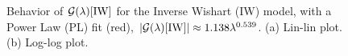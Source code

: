 \begin{figure}[t]
  \centering
    \caption{Behavior of $\mathcal{G(\lambda)}[\mathrm{IW}]$ for the Inverse Wishart (IW) model,
       with a Power Law (PL) fit (red), $|\mathcal{G(\lambda)}[\mathrm{IW}]|\approx 1.138 \lambda^{0.539}$.
      (a)  Lin-lin plot. (b) Log-log plot.
}
    \label{fig:InverseWishartGx}
\end{figure}

%
%
%


